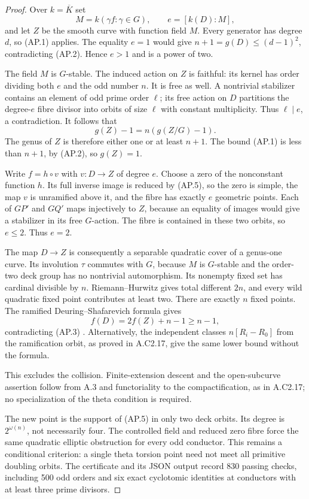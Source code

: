 \begin{proof}
Over $k=\overline K$ set
\[
              M=k(\gamma f:\gamma\in G),\qquad
              e=[k(D):M],
\]
and let $Z$ be the smooth curve with function field
$M$. Every generator has degree $d$, so (AP.1)
applies. The equality $e=1$ would give
$n+1=g(D)\le(d-1)^2$, contradicting (AP.2).
Hence $e>1$ and is a power of two.

The field $M$ is $G$-stable. The induced action on
$Z$ is faithful: its kernel has order dividing
both $e$ and the odd number $n$. It is free as
well. A nontrivial stabilizer contains an element
of odd prime order $\ell$; its free action on
$D$ partitions the degree-$e$ fibre divisor into
orbits of size $\ell$ with constant multiplicity.
Thus $\ell\mid e$, a contradiction.
It follows that
\[
                 g(Z)-1=n(g(Z/G)-1).
\]
The genus of $Z$ is therefore either one or at
least $n+1$. The bound (AP.1) is less than $n+1$,
by (AP.2), so $g(Z)=1$.

Write $f=h\circ v$ with $v:D\to Z$ of degree $e$.
Choose a zero of the nonconstant function $h$.
Its full inverse image is reduced by (AP.5), so
the zero is simple, the map $v$ is unramified
above it, and the fibre has exactly $e$ geometric
points. Each of $GP'$ and $GQ'$ maps injectively
to $Z$, because an equality of images would
give a stabilizer in its free $G$-action.
The fibre is contained in these two orbits, so
$e\le2$. Thus $e=2$.

The map $D\to Z$ is consequently a separable
quadratic cover of a genus-one curve. Its
involution $\tau$ commutes with $G$, because
$M$ is $G$-stable and the order-two deck group
has no nontrivial automorphism.
Its nonempty fixed set has cardinal divisible
by $n$. Riemann--Hurwitz gives total different
$2n$, and every wild quadratic fixed point
contributes at least two. There are exactly
$n$ fixed points. The ramified
Deuring--Shafarevich formula gives
\[
                         f(D)=2f(Z)+n-1\ge n-1,
\]
contradicting (AP.3)
\citep[Corollary 1.8, pp.~35--36]{A_PrimCrew1984}.
Alternatively, the independent classes
$n[R_i-R_0]$ from the ramification orbit, as
proved in A.C2.17, give the same lower bound
without the formula.

This excludes the collision. Finite-extension
descent and the open-subcurve assertion follow
from A.3 and functoriality to the compactification,
as in A.C2.17; no specialization of the theta
condition is required.

The new point is the support of (AP.5) in only
two deck orbits. Its degree is $2^{\omega(n)}$,
not necessarily four. The controlled field
and reduced zero fibre force the same quadratic
elliptic obstruction for every odd conductor.
This remains a conditional criterion: a single
theta torsion point need not meet all primitive
doubling orbits.
The certificate
and its JSON output record 830 passing checks,
including 500 odd orders and six exact
cyclotomic identities at conductors with at
least three prime divisors.
\end{proof}
